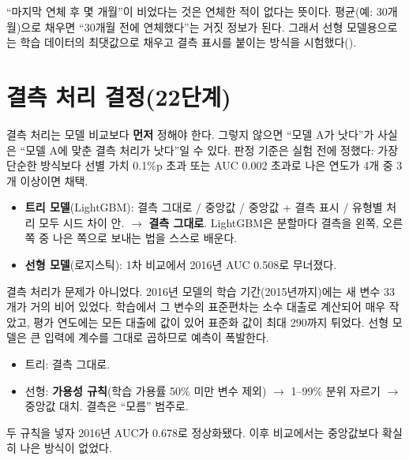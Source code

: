 \begin{whybox}
``마지막 연체 후 몇 개월''이 비었다는 것은 연체한 적이 없다는 뜻이다. 평균(예: 30개월)으로 채우면 ``30개월 전에 연체했다''는 거짓 정보가 된다. 그래서 선형 모델용으로는 학습 데이터의 최댓값으로 채우고 결측 표시를 붙이는 방식을 시험했다().
\end{whybox}

\section{결측 처리 결정(22단계)}
결측 처리는 모델 비교보다 \textbf{먼저} 정해야 한다. 그렇지 않으면 ``모델 A가 낫다''가 사실은 ``모델 A에 맞춘 결측 처리가 낫다''일 수 있다. 판정 기준은 실험 전에 정했다: 가장 단순한 방식보다 선별 가치 0.1\%p 초과 또는 AUC 0.002 초과로 나은 연도가 4개 중 3개 이상이면 채택.

\begin{itemize}[leftmargin=*]
\item \textbf{트리 모델}(LightGBM): 결측 그대로 / 중앙값 / 중앙값 + 결측 표시 / 유형별 처리 모두 시드 차이 안. \ensuremath{\to} \textbf{결측 그대로}. LightGBM은 분할마다 결측을 왼쪽, 오른쪽 중 나은 쪽으로 보내는 법을 스스로 배운다.
\item \textbf{선형 모델}(로지스틱): 1차 비교에서 2016년 AUC 0.508로 무너졌다.
\end{itemize}

\begin{warnbox}
결측 처리가 문제가 아니었다. 2016년 모델의 학습 기간(2015년까지)에는 새 변수 33개가 거의 비어 있었다. 학습에서 그 변수의 표준편차는 소수 대출로 계산되어 매우 작았고, 평가 연도에는 모든 대출에 값이 있어 표준화 값이 최대 290까지 튀었다. 선형 모델은 큰 입력에 계수를 그대로 곱하므로 예측이 폭발한다.
\end{warnbox}

\begin{keybox}[확정 방침]
\begin{itemize}[leftmargin=*]
\item 트리: 결측 그대로.
\item 선형: \textbf{가용성 규칙}(학습 가용률 50\% 미만 변수 제외) \ensuremath{\to} 1--99\% 분위 자르기 \ensuremath{\to} 중앙값 대치.  결측은 ``모름'' 범주로.
\end{itemize}
두 규칙을 넣자 2016년 AUC가 0.678로 정상화됐다. 이후 비교에서는 중앙값보다 확실히 나은 방식이 없었다.
\end{keybox}

